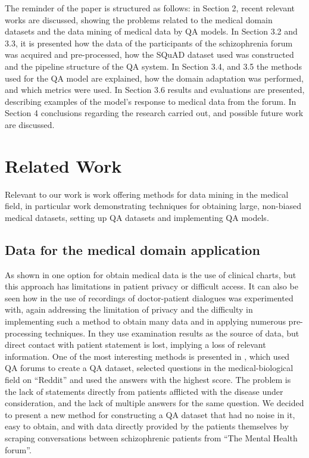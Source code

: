 \documentclass[runningheads]{llncs}
\begin{document}
The reminder of the paper is structured as follows:
in Section 2, recent relevant works are discussed, showing the problems related to the medical domain datasets and the data mining of medical data by QA models.
In Section 3.2 and 3.3, it is presented how the data of the participants of the schizophrenia forum was acquired and pre-processed, how the SQuAD dataset used was constructed and the pipeline structure of the QA system.
In Section 3.4, and 3.5 the methods used for the QA model are explained, how the domain adaptation was performed, and which metrics were used.
In Section 3.6 results and evaluations are presented, describing examples of the model's response to medical data from the forum.
In Section 4 conclusions regarding the research carried out, and possible future work are discussed.

\section{Related Work}
Relevant to our work is work offering methods for data mining in the medical field, in particular work demonstrating techniques for obtaining large, non-biased medical datasets, setting up QA datasets and implementing QA models.
\subsection{Data for the medical domain application}
As shown in \cite{c6} one option for obtain medical data is the use of clinical charts, but this approach has limitations in patient privacy or difficult access. It can also be seen how in \cite{c8} the use of recordings of doctor-patient dialogues was experimented with, again addressing the limitation of privacy and the difficulty in implementing such a method to obtain many data and in applying numerous pre-processing techniques. In \cite{c9} they use examination results as the source of data, but direct contact with patient statement is lost, implying a loss of relevant information. One of the most interesting methods is presented in \cite{c32}, which used QA forums to create a QA dataset, selected questions in the medical-biological field on ``Reddit'' and used the answers with the highest score.
The problem is the lack of statements directly from patients afflicted with the disease under consideration, and the lack of multiple answers for the same question. We decided to present a new method for constructing a QA dataset that had no noise in it, easy to obtain, and with data directly provided by the patients themselves by scraping conversations between schizophrenic patients from ``The Mental Health forum''.
\end{document}
